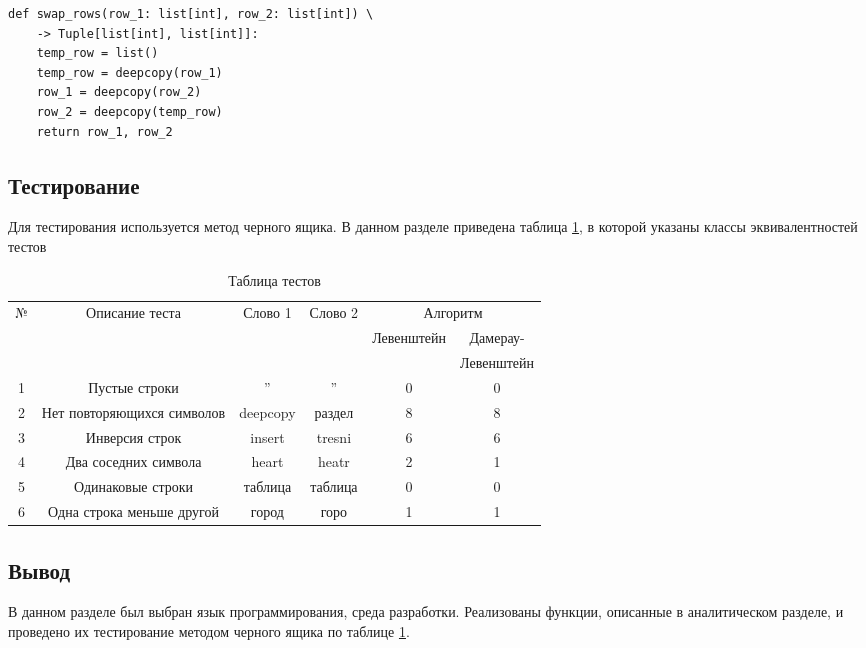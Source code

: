 \documentclass[12pt, a4paper]{article}
\begin{document}
\begin{lstlisting}[label=some-code,caption=Программный код создания для кэша в виде строки]
	def swap_rows(row_1: list[int], row_2: list[int]) \
	-> Tuple[list[int], list[int]]:
	temp_row = list()
	temp_row = deepcopy(row_1)
	row_1 = deepcopy(row_2)
	row_2 = deepcopy(temp_row)
	return row_1, row_2
\end{lstlisting}

\subsection{Тестирование}
Для тестирования используется метод черного ящика. В данном разделе приведена таблица \ref{table:ref1}, в которой указаны классы эквивалентностей тестов \\

\begin{table}[ht!]
	\centering
	\caption{Таблица тестов}
	\label{table:ref1}
	\begin{tabular}{|c|c|c|c|c|c|}
		\hline
		\multirow{3}{*}{№} & \multirow{3}{*}{Описание теста} & \multirow{3}{*}{Слово 1}  &  \multirow{3}{*}{Слово 2}   & \multicolumn{2}{|c|}{Алгоритм}\\ \cline{5-6}
		&                &          &            &\multirow{2}{*}{Левенштейн}   &Дамерау-	\\ 
		&                &          &            &             &Левенштейн       	        \\ \hline
		1& Пустые строки  &  ''      &    ''      &   0         &  0 						\\ \hline
		2& Нет повторяющихся символов & deepcopy & раздел & 8   &  8                       \\ \hline
		3& Инверсия строк & insert   &tresni      &   6         &  6                       \\ \hline
		4& Два соседних символа       & heart    & heatr  & 2   &  1                       \\ \hline
		5& Одинаковые строки          & таблица  & таблица& 0   &  0						\\ \hline
		6& Одна строка меньше другой  & город    & горо   & 1   &  1						\\ \hline
	\end{tabular}
\end{table}

\subsection{Вывод}
В данном разделе был выбран язык программирования, среда разработки. Реализованы функции, описанные в аналитическом разделе, и проведено их тестирование методом черного ящика по таблице \ref{table:ref1}. 
\end{document}
